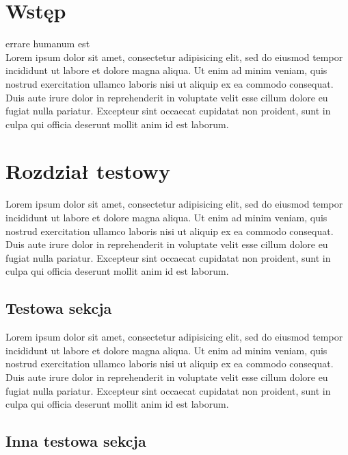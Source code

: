 \documentclass[a4paper,titlepage,twoside,openright]{report} %
\begin{document}
	
			
	\tableofcontents
	\newpage
	

	\chapter*{Wstęp}
		errare humanum est\\
	
		Lorem ipsum dolor sit amet, consectetur adipisicing elit, sed do eiusmod tempor incididunt 
		ut labore et dolore magna aliqua. Ut enim ad 	minim veniam, quis nostrud exercitation 
		ullamco laboris nisi ut aliquip ex ea commodo consequat. Duis aute irure dolor in reprehenderit 
		in voluptate velit esse cillum dolore eu fugiat nulla pariatur. Excepteur sint occaecat 
		cupidatat non proident, sunt in culpa qui officia deserunt mollit anim id est laborum.
	
	\cleardoublepage
	\pagestyle{fancy}	
	
	\chapter{Rozdział testowy}	
	
		Lorem ipsum dolor sit amet, consectetur adipisicing elit, sed do eiusmod tempor incididunt 
		ut labore et dolore magna aliqua. Ut enim ad 	minim veniam, quis nostrud exercitation 
		ullamco laboris nisi ut aliquip ex ea commodo consequat. Duis aute irure dolor in reprehenderit 
		in voluptate velit esse cillum dolore eu fugiat nulla pariatur. Excepteur sint occaecat 
		cupidatat non proident, sunt in culpa qui officia deserunt mollit anim id est laborum.
		
		\section{Testowa sekcja}
		
		Lorem ipsum dolor sit amet, consectetur adipisicing elit, sed do eiusmod tempor incididunt 
		ut labore et dolore magna aliqua. Ut enim ad 	minim veniam, quis nostrud exercitation 
		ullamco laboris nisi ut aliquip ex ea commodo consequat. Duis aute irure dolor in reprehenderit 
		in voluptate velit esse cillum dolore eu fugiat nulla pariatur. Excepteur sint occaecat 
		cupidatat non proident, sunt in culpa qui officia deserunt mollit anim id est laborum.
		
		\section{Inna testowa sekcja}
		
\end{document}
